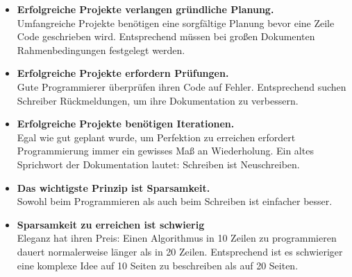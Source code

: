 \documentclass[a4paper,titlepage=true,twoside]{scrartcl}
\newcommand{\gquote}[1]{\glqq #1\grqq}
\newcommand{\itemtitle}[1]{\textbf{#1}}
\begin{document}
\begin{small}
\begin{itemize}
 \item \itemtitle{Erfolgreiche Projekte verlangen gründliche Planung.} \\
  Umfangreiche Projekte benötigen eine sorgfältige Planung bevor eine Zeile Code
geschrieben wird. Entsprechend müssen bei großen Dokumenten Rahmenbedingungen 
festgelegt werden.
 \item \itemtitle{Erfolgreiche Projekte erfordern Prüfungen.} \\
Gute Programmierer überprüfen ihren Code auf Fehler. Entsprechend suchen 
Schreiber Rückmeldungen, um ihre Dokumentation zu verbessern.
 \item \itemtitle{Erfolgreiche Projekte benötigen Iterationen.} \\
Egal wie gut geplant wurde, um Perfektion zu erreichen erfordert Programmierung 
immer ein gewisses Maß an Wiederholung. Ein altes Sprichwort der Dokumentation
lautet: \gquote{Schreiben ist Neuschreiben}.
 \item \itemtitle{Das wichtigste Prinzip ist Sparsamkeit.} \\
Sowohl beim Programmieren als auch beim Schreiben ist einfacher besser.
 \item \itemtitle{Sparsamkeit zu erreichen ist schwierig} \\
Eleganz hat ihren Preis: Einen Algorithmus in 10 Zeilen zu programmieren dauert 
normalerweise länger als in 20 Zeilen. Entsprechend ist es schwieriger eine
komplexe Idee auf 10 Seiten zu beschreiben als auf 20 Seiten.
\end{itemize}
\end{small}
\end{document}
